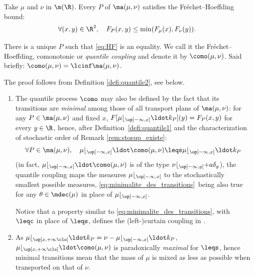 \begin{reminder}Take $\mu$ and $\nu$ in $\m(\R)$. Every $P$ of $\ma(\mu,\nu)$ satisfies the Fréchet--Hoeffding bound:
\begin{equation}\label{eq:HF}
\forall(x,y)\in\R^2,\quad F_P(x,y)\leq \min(F_\mu(x),F_\nu(y)).
\end{equation}
\end{reminder}

\begin{prodefinition}\label{defi:quantile1}There is a unique $P$ such that \eqref{eq:HF} is an equality. We call it the Fréchet--Hoeffding, comonotonic or \emph{quantile coupling} and denote it by $\como(\mu,\nu)$. Said briefly: $\como(\mu,\nu)=\lcinf \ma(\mu,\nu)$.
\end{prodefinition}

The proof follows from Definition \ref{defi:quantile2}, see below.

\skpt
\begin{rem}\label{rem:q_is_mini}
\begin{enumerate}
\item
The quantile process $\como$ may also be defined by the fact that its transitions are \emph{minimal} among those of all transport plans of $\ma(\mu,\nu)$: for any $P\in\ma(\mu,\nu)$ and fixed $x$, $F[\mu\lfloor_{\op]-\infty,x]}{}\ldot k_P](y)= F_P(x,y)$ for every $y\in \R$, hence, after Definition~\ref{defi:quantile1} and the characterization of stochastic order of Remark \ref{rem:stosup_existe}:
\begin{equation}\label{eq:minimalite_des_transitions}\forall P\in\ma(\mu,\nu),\quad\mu\lfloor_{\op]-\infty,x]}{}{}\ldot\como(\mu,\nu)\leqs\mu\lfloor_{\op]-\infty,x]}{}{}\ldot k_P
\end{equation}
(in fact, $\mu\lfloor_{\op]-\infty,x]}{}{}\ldot\como(\mu,\nu)$ is of the type $\nu\lfloor_{\op]-\infty,y[}+a\delta_y$), \ie the quantile coupling maps the measures $\mu\lfloor_{\op]-\infty,x]}$ to the stochastically smallest possible measures, \eqref{eq:minimalite_des_transitions}~being also true for any $\theta\in \mdec(\mu)$ in place of $\mu\lfloor_{\op]-\infty,x]}$.

Notice that a property similar to \eqref{eq:minimalite_des_transitions}, with $\leqc$ in place of $\leqs$, defines the (left\nobreakdash-)curtain coupling in \cite{BJ}.

\item
As $\mu\lfloor_{\op]x,+\infty\clo[}{}{}\ldot k_P=\nu-\mu\lfloor_{\op]-\infty,x]}{}{}\ldot k_{P}$, $\mu\lfloor_{\op]x,+\infty\clo[}{}{}\ldot\como(\mu,\nu)$ is paradoxically \emph{maximal} for $\leqs$, hence minimal transitions mean that the mass of $\mu$ is mixed as less as possible when transported on that of $\nu$.
\end{enumerate}
\end{rem}

